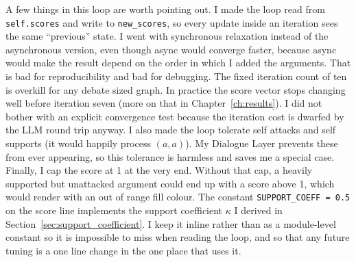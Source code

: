 A few things in this loop are worth pointing out. I made the loop read from \texttt{self.scores} and write to \texttt{new\_scores}, so every update inside an iteration sees the same ``previous'' state. I went with synchronous relaxation instead of the asynchronous version, even though async would converge faster, because async would make the result depend on the order in which I added the arguments. That is bad for reproducibility and bad for debugging. The fixed iteration count of ten is overkill for any debate sized graph. In practice the score vector stops changing well before iteration seven (more on that in Chapter~\ref{ch:results}). I did not bother with an explicit convergence test because the iteration cost is dwarfed by the LLM round trip anyway. I also made the loop tolerate self attacks and self supports (it would happily process $(a, a)$). My Dialogue Layer prevents these from ever appearing, so this tolerance is harmless and saves me a special case. Finally, I cap the score at 1 at the very end. Without that cap, a heavily supported but unattacked argument could end up with a score above 1, which would render with an out of range fill colour. The constant \texttt{SUPPORT\_COEFF~=~0.5} on the score line implements the support coefficient $\kappa$ I derived in Section~\ref{sec:support_coefficient}. I keep it inline rather than as a module-level constant so it is impossible to miss when reading the loop, and so that any future tuning is a one line change in the one place that uses it.

